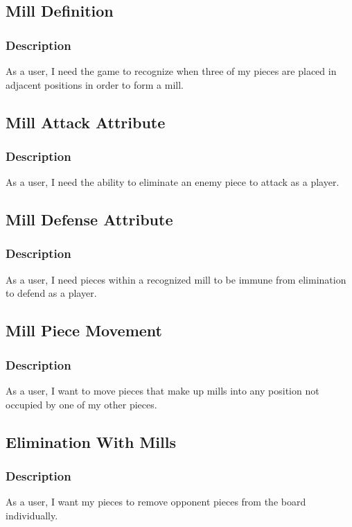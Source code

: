 \documentclass[11pt]{article}
\begin{document}
\subsection{Mill Definition}
\label{sec:org856022b}
\subsubsection*{Description}
\label{sec:orgf16cd09}
As a user, I need the game to recognize when three of my pieces are placed in adjacent positions in order to form a mill.

\subsection{Mill Attack Attribute}
\label{sec:org0918f25}
\subsubsection*{Description}
\label{sec:org261136a}
As a user, I need the ability to eliminate an enemy piece to attack as a player.

\subsection{Mill Defense Attribute}
\label{sec:org8ab2eca}
\subsubsection*{Description}
\label{sec:org206bfd8}
As a user, I need pieces within a recognized mill to be immune from elimination to defend as a
player.

\subsection{Mill Piece Movement}
\label{sec:orgb7d6521}
\subsubsection*{Description}
\label{sec:org9182529}
As a user, I want to move pieces that make up mills into any position not occupied by one of my
other pieces.

\subsection{Elimination With Mills}
\label{sec:orgeab77bb}
\subsubsection*{Description}
\label{sec:orgbbf95bc}
As a user, I want my pieces to remove opponent pieces from the board individually.
\end{document}
